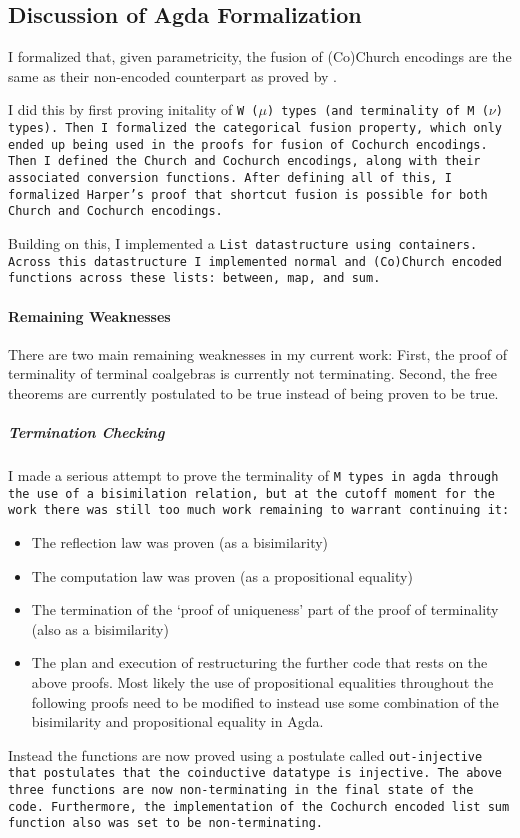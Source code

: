 
\subsection{Discussion of Agda Formalization}\label{sec:agda_form_disc}
I formalized that, given parametricity, the fusion of (Co)Church encodings are the same as their non-encoded counterpart as proved by \cite{Harper2011}.

I did this by first proving initality of \tt{W} ($\mu$) types (and terminality of \tt{M} ($\nu$) types).
Then I formalized the categorical fusion property, which only ended up being used in the proofs for fusion of Cochurch encodings.
Then I defined the Church and Cochurch encodings, along with their associated conversion functions.
After defining all of this, I formalized Harper's proof that shortcut fusion is possible for both Church and Cochurch encodings.

Building on this, I implemented a \tt{List} datastructure using containers.
Across this datastructure I implemented normal and (Co)Church encoded functions across these lists: \tt{between}, \tt{map}, and \tt{sum}.

\paragraph{Remaining Weaknesses}
There are two main remaining weaknesses in my current work:
First, the proof of terminality of terminal coalgebras is currently not terminating.
Second, the free theorems are currently postulated to be true instead of being proven to be true.

\subparagraph{Termination Checking}
I made a serious attempt to prove the terminality of \tt{M} types in agda through the use of a bisimilation relation, but at the cutoff moment for the work there was still too much work remaining to warrant continuing it:
\begin{itemize}[noitemsep]
  \item The reflection law was proven (as a bisimilarity)
  \item The computation law was proven (as a propositional equality)
  \item The termination of the `proof of uniqueness' part of the proof of terminality (also as a bisimilarity)
  \item The plan and execution of restructuring the further code that rests on the above proofs.
  Most likely the use of propositional equalities throughout the following proofs need to be modified to instead use some combination of the bisimilarity and propositional equality in Agda.
\end{itemize}
Instead the functions are now proved using a postulate called \tt{out-injective} that postulates that the coinductive datatype is injective.
The above three functions are now non-terminating in the final state of the code.
Furthermore, the implementation of the Cochurch encoded list \tt{sum} function also was set to be non-terminating.

